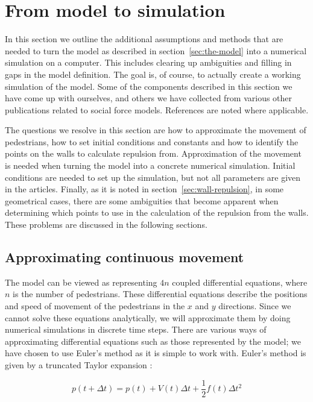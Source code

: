 \section{From model to simulation}
\label{sec:model-to-simulation}
In this section we outline the additional assumptions and methods that are 
needed to turn the model as described in section~\ref{sec:the-model} into a 
numerical simulation on a computer. This includes clearing up ambiguities and 
filling in gaps in the model definition.  The goal is, of course, to actually 
create a working simulation of the model.  Some of the components described in 
this section we have come up with ourselves, and others we have collected from 
various other publications related to social force models. References are 
noted where applicable.

The questions we resolve in this section are how to approximate the movement 
of pedestrians, how to set initial conditions and constants and how to 
identify the points on the walls to calculate repulsion from. Approximation of 
the movement is needed when turning the model into a concrete numerical 
simulation. Initial conditions are needed to set up the simulation, but not 
all parameters are given in the articles. Finally, as it is noted in 
section~\ref{sec:wall-repulsion}, in some geometrical cases, there are some 
ambiguities that become apparent when determining which points to use in the 
calculation of the repulsion from the walls. These problems are discussed in 
the following sections.

\subsection{Approximating continuous movement}
\label{sec:continuous-movement}
The model can be viewed as representing $4n$ coupled differential 
equations, where $n$ is the number of pedestrians. These differential 
equations describe the positions and speed of movement of the pedestrians in 
the $x$ and $y$ directions. Since we cannot solve these equations 
analytically, we will approximate them by doing numerical simulations in 
discrete time steps. There are various ways of approximating differential 
equations such as those represented by the model; we have chosen to use 
Euler's method as it is simple to work with. Euler's method is given by a 
truncated Taylor expansion \cite{MD}:

\begin{equation}
    p(t+\Delta t)=p(t)+V(t)\Delta t + \frac{1}{2}f(t)\Delta t^2
\end{equation}     

